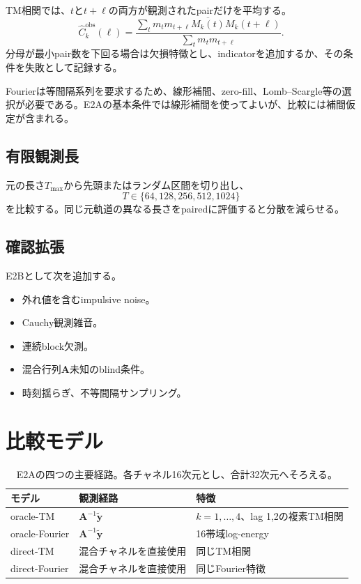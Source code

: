 \documentclass[a4paper,11pt,oneside,openany]{ltjsbook}
\newcommand{\vect}[1]{\bm{#1}}
\newcommand{\mat}[1]{\bm{#1}}
\begin{document}
TM相関では、\(t\)と\(t+\ell\)の両方が観測されたpairだけを平均する。
\begin{equation}
  \widehat C_k^{\mathrm{obs}}(\ell)
  =\frac{\sum_t m_t m_{t+\ell}\overline{M_k(t)}M_k(t+\ell)}
  {\sum_t m_tm_{t+\ell}}.
  \label{eq:pairwise_complete_tm}
\end{equation}
分母が最小pair数を下回る場合は欠損特徴とし、indicatorを追加するか、その条件を失敗として記録する。

Fourierは等間隔系列を要求するため、線形補間、zero-fill、Lomb--Scargle等の選択が必要である。E2Aの基本条件では線形補間を使ってよいが、比較には補間仮定が含まれる。

\subsection{有限観測長}

元の長さ\(T_{\max}\)から先頭またはランダム区間を切り出し、
\begin{equation}
  T\in\{64,128,256,512,1024\}
  \label{eq:e2_observation_lengths}
\end{equation}
を比較する。同じ元軌道の異なる長さをpairedに評価すると分散を減らせる。

\subsection{確認拡張}

E2Bとして次を追加する。

\begin{itemize}
  \item 外れ値を含むimpulsive noise。
  \item Cauchy観測雑音。
  \item 連続block欠測。
  \item 混合行列\(\mat A\)未知のblind条件。
  \item 時刻揺らぎ、不等間隔サンプリング。
\end{itemize}

\section{比較モデル}

\begin{table}[htbp]
\centering
\caption{E2Aの四つの主要経路。各チャネル16次元とし、合計32次元へそろえる。}
\label{tab:e2_models}
\begin{tabularx}{\textwidth}{p{36mm}p{31mm}X}
\toprule
モデル & 観測経路 & 特徴 \\
\midrule
oracle-TM & \(\mat A^{-1}\widetilde{\vect y}\) & \(k=1,\dots,4\)、lag 1,2の複素TM相関 \\
oracle-Fourier & \(\mat A^{-1}\widetilde{\vect y}\) & 16帯域log-energy \\
direct-TM & 混合チャネルを直接使用 & 同じTM相関 \\
direct-Fourier & 混合チャネルを直接使用 & 同じFourier特徴 \\
\bottomrule
\end{tabularx}
\end{table}
\end{document}
